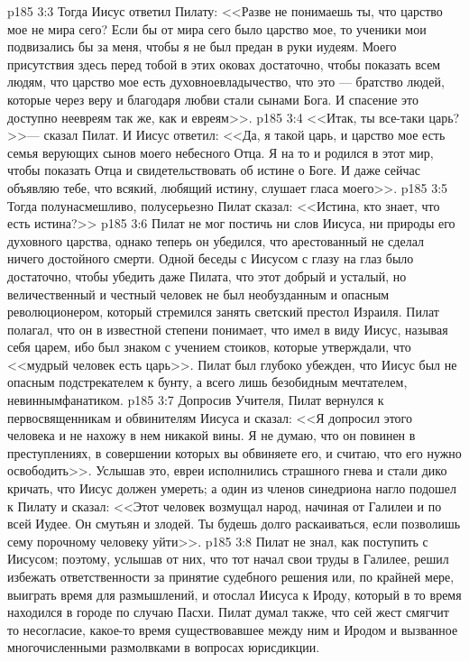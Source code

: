 \vs p185 3:3 Тогда Иисус ответил Пилату: <<Разве не понимаешь ты, что царство мое не мира сего? Если бы от мира сего было царство мое, то ученики мои подвизались бы за меня, чтобы я не был предан в руки иудеям. Моего присутствия здесь перед тобой в этих оковах достаточно, чтобы показать всем людям, что царство мое есть духовноевладычество, что это --- братство людей, которые через веру и благодаря любви стали сынами Бога. И спасение это доступно неевреям так же, как и евреям>>.
\vs p185 3:4 <<Итак, ты все\hyp{}таки царь?>>--- сказал Пилат. И Иисус ответил: <<Да, я такой царь, и царство мое есть семья верующих сынов моего небесного Отца. Я на то и родился в этот мир, чтобы показать Отца и свидетельствовать об истине о Боге. И даже сейчас объявляю тебе, что всякий, любящий истину, слушает гласа моего>>.
\vs p185 3:5 Тогда полунасмешливо, полусерьезно Пилат сказал: <<Истина, кто знает, что есть истина?>>
\vs p185 3:6 Пилат не мог постичь ни слов Иисуса, ни природы его духовного царства, однако теперь он убедился, что арестованный не сделал ничего достойного смерти. Одной беседы с Иисусом с глазу на глаз было достаточно, чтобы убедить даже Пилата, что этот добрый и усталый, но величественный и честный человек не был необузданным и опасным революционером, который стремился занять светский престол Израиля. Пилат полагал, что он в известной степени понимает, что имел в виду Иисус, называя себя царем, ибо был знаком с учением стоиков, которые утверждали, что <<мудрый человек есть царь>>. Пилат был глубоко убежден, что Иисус был не опасным подстрекателем к бунту, а всего лишь безобидным мечтателем, невиннымфанатиком.
\vs p185 3:7 Допросив Учителя, Пилат вернулся к первосвященникам и обвинителям Иисуса и сказал: <<Я допросил этого человека и не нахожу в нем никакой вины. Я не думаю, что он повинен в преступлениях, в совершении которых вы обвиняете его, и считаю, что его нужно освободить>>. Услышав это, евреи исполнились страшного гнева и стали дико кричать, что Иисус должен умереть; а один из членов синедриона нагло подошел к Пилату и сказал: <<Этот человек возмущал народ, начиная от Галилеи и по всей Иудее. Он смутьян и злодей. Ты будешь долго раскаиваться, если позволишь сему порочному человеку уйти>>.
\vs p185 3:8 Пилат не знал, как поступить с Иисусом; поэтому, услышав от них, что тот начал свои труды в Галилее, решил избежать ответственности за принятие судебного решения или, по крайней мере, выиграть время для размышлений, и отослал Иисуса к Ироду, который в то время находился в городе по случаю Пасхи. Пилат думал также, что сей жест смягчит то несогласие, какое\hyp{}то время существовавшее между ним и Иродом и вызванное многочисленными размолвками в вопросах юрисдикции.
